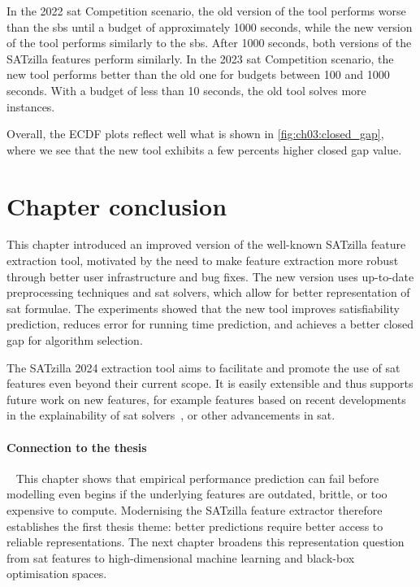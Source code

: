 In the 2022 \gls{sat} Competition scenario, the old version of the tool performs worse than the \gls{sbs} until a budget of approximately 1000 seconds, while the new version of the tool performs similarly to the \gls{sbs}. After 1000 seconds, both versions of the SATzilla features perform similarly. In the 2023 \gls{sat} Competition scenario, the new tool performs better than the old one for budgets between 100 and 1000 seconds. With a budget of less than 10 seconds, the old tool solves more instances.

Overall, the ECDF plots reflect well what is shown in \cref{fig:ch03:closed_gap}, where we see that the new tool exhibits a few percents higher closed gap value.


\section{Chapter conclusion}
\label{sec:ch03:conclusions}

This chapter introduced an improved version of the well-known SATzilla feature extraction tool, motivated by the need to make feature extraction more robust through better user infrastructure and bug fixes.
The new version uses up-to-date preprocessing techniques and \gls{sat} solvers, which allow for better representation of \gls{sat} formulae.
The experiments showed that the new tool improves satisfiability prediction, reduces error for running time prediction, and achieves a better closed gap for algorithm selection.

The SATzilla 2024 extraction tool aims to facilitate and promote the use of \gls{sat} features even beyond their current scope.
It is easily extensible and thus supports future work on new features, for example features based on recent developments in the explainability of \gls{sat} solvers~\cite{ElfEtAl18}, or other advancements in \gls{sat}.

\paragraph{Connection to the thesis}~
This chapter shows that empirical performance prediction can fail before modelling even begins if the underlying features are outdated, brittle, or too expensive to compute.
Modernising the SATzilla feature extractor therefore establishes the first thesis theme: better predictions require better access to reliable representations.
The next chapter broadens this representation question from \gls{sat} features to high-dimensional machine learning and black-box optimisation spaces.
